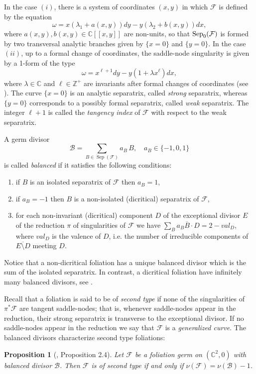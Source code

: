 \documentclass[12pt,letterpaper]{amsart}
\newcommand{\C}{\mathbb{C}}
\newcommand{\F}{\mathcal{F}}
\newcommand{\B}{\mathcal{B}}
\newcommand{\sep}{\mbox{\rm Sep}}
\newtheorem{proposition}[theorem]{Proposition}
\begin{document}
In the case $(i)$, there is a system of coordinates  $(x,y)$ in which $\F$ is defined by the equation
\begin{equation}
\label{non-degenerate}
\omega=x(\lambda_1+a(x,y))dy-y(\lambda_2+b(x,y))dx,
\end{equation}
where $a(x,y),b(x,y)  \in {\mathbb C}[[x,y]]$ are non-units, so that  $\sep_0(\F)$ is formed by two
transversal analytic branches given by $\{x=0\}$ and $\{y=0\}$. In the case $(ii)$, up to a formal change of coordinates, the  saddle-node singularity is given by a 1-form of the type
\begin{equation}
\label{saddle-node-formal}
\omega = x^{\ell+1} dy-y(1 + \lambda x^{\ell})dx,
\end{equation}
where $\lambda \in \mathbb{C}$ and $\ell \in \mathbb{Z}^{+}$ are invariants after formal changes of coordinates (see \cite[Proposition 4.3]{martinetramis}).
The curve $\{x=0\}$   is an analytic separatrix, called {\em strong} separatrix, whereas $\{y=0\}$  corresponds to a possibly formal separatrix, called {\em weak} separatrix. The integer $\ell+1$ is called the  \textit{tangency index} of $\F$ with respect to the weak separatrix. 

\par  A germ divisor 
\[\displaystyle \B=\sum\limits_{B\in \operatorname{Sep}(\mathcal{F})} a_{B}\, B,\quad a_B\in\{-1,0,1\}\] is called \textit{balanced} if it satisfies the following conditions:
\begin{enumerate}
\item if $B$ is an isolated separatrix of $\F$ then $a_B=1$, 
\item if $a_B=-1$ then $B$ is a non-isolated (dicritical) separatrix of $\F$,
\item for each non-invariant (dicritical) component $D$ of the exceptional divisor $E$ of the reduction $\pi$ of singularities of $\F$ we have $\sum_{B}a_B \overline{B}\cdot D=2-val_D$, where $val_D$ is the valence of $D$, i.e. the number of irreducible components of $\overline{E\setminus D}$ meeting $D$.
\end{enumerate}
Notice that a non-dicritical foliation has a unique balanced divisor which is the sum of the isolated separatrix. In contrast, a dicritical foliation have infinitely many balanced divisors, see \cite{Genzmer}.
\par Recall that a foliation is said to be of \textit{second type} if none of the singularities of $\pi^*\mathcal{F}$ are tangent saddle-nodes; that is, whenever saddle-nodes appear in the reduction, their strong separatrix is transverse to the exceptional divisor. If no saddle-nodes appear in the reduction we say that $\F$ is a \textit{generalized curve}.
The balanced divisors characterize second type foliations:
\begin{proposition}[\cite{Genzmer}, Proposition 2.4]\label{prop:Equa-Ba}
Let $\F$ be a foliation germ on $(\C^2,0)$ with balanced divisor $\B$. Then $\F$ is of second type if and only if $\nu(\F)=\nu(\B)-1$.
\end{proposition}
\end{document}

